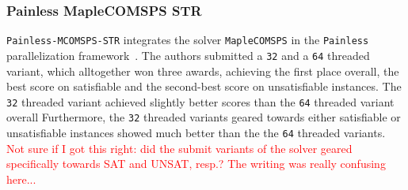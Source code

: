 \documentclass{elsarticle}
\makeatletter
\newcommand{\solver}[1]{\texttt{#1}}
\newcommand{\stack}[1]{%
\begin{tabular}{@{}l@{}}#1\checknextarg}
\newcommand{\checknextarg}{\@ifnextchar\bgroup{\gobblenextarg}{\end{tabular}}}
\newcommand{\gobblenextarg}[1]{\\#1\@ifnextchar\bgroup{\gobblenextarg}{\end{tabular}}}
\makeatother
\begin{document}


\subsubsection{Painless MapleCOMSPS STR} 

\solver{Painless-MCOMSPS-STR} integrates the solver \solver{MapleCOMSPS} in the \solver{Painless} parallelization framework~\cite{Frioux:2017:Painless,Liang:2017:Maplecomsps}. 
The authors submitted a \solver{32} and a \solver{64} threaded variant, which alltogether won three awards, achieving
 the first place overall, the best score on satisfiable and the second-best score on unsatisfiable instances. 
The \solver{32} threaded variant achieved slightly better scores than the \solver{64} threaded variant overall
Furthermore, 
 the \solver{32} threaded variants geared towards either satisfiable or unsatisfiable instances 
showed much better  than the the \solver{64} threaded variants. \textcolor{red}{Not sure if I got this right: did the submit variants of the solver geared specifically towards SAT and UNSAT, resp.? The writing was really confusing here...}
\end{document}
